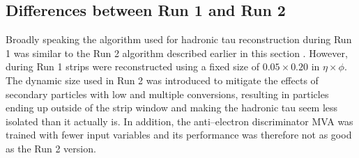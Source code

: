 \subsection{Differences between Run 1 and Run 2}
\label{sec:objects_taus_diff}
Broadly speaking the algorithm used for hadronic tau reconstruction during Run 1
was similar to the Run 2 algorithm described earlier in this section \cite{cms-tau-run1}. However, during
Run 1 strips were reconstructed using a fixed size of $0.05 \times 0.20$ in $\eta \times \phi$.
The dynamic size used in Run 2 was introduced to mitigate the effects of secondary particles
with low \pT and multiple \APelectron\Pelectron conversions, resulting in particles ending up outside of 
the strip window and making the hadronic tau seem less isolated than it actually is.
In addition, the anti--electron discriminator MVA was trained with fewer input variables and its performance
was therefore not as good as the Run 2 version.


